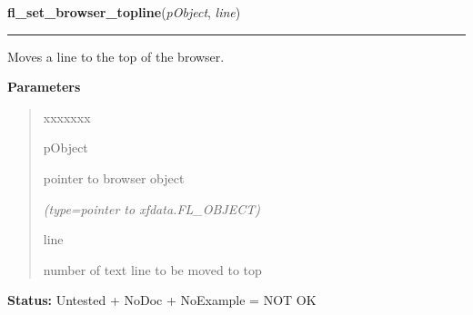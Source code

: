 \hspace{.8\funcindent}\begin{boxedminipage}{\funcwidth}

    \raggedright \textbf{fl\_set\_browser\_topline}(\textit{pObject}, \textit{line})

    \vspace{-1.5ex}

    \rule{\textwidth}{0.5\fboxrule}
\setlength{\parskip}{2ex}
    Moves a line to the top of the browser.

\setlength{\parskip}{1ex}
      \textbf{Parameters}
      \vspace{-1ex}

      \begin{quote}
        \begin{Ventry}{xxxxxxx}

          \item[pObject]

          pointer to browser object

            {\it (type=pointer to xfdata.FL\_OBJECT)}

          \item[line]

          number of text line to be moved to top

        \end{Ventry}

      \end{quote}

\textbf{Status:} Untested + NoDoc + NoExample = NOT OK



    \end{boxedminipage}

    \label{xformslib:library:fl_set_browser_bottomline}

    \vspace{0.5ex}

